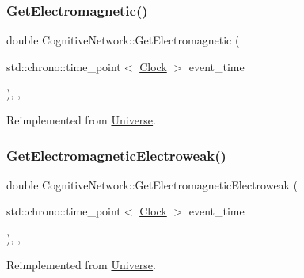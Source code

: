 \mbox{\label{classCognitiveNetwork_a09e5a1c774c84529a7adfe56fadb7467}} 
\subsubsection{\texorpdfstring{Get\+Electromagnetic()}{GetElectromagnetic()}}
{\footnotesize\ttfamily double Cognitive\+Network\+::\+Get\+Electromagnetic (\begin{DoxyParamCaption}\item[{std\+::chrono\+::time\+\_\+point$<$ \mbox{\hyperlink{universe_8h_a0ef8d951d1ca5ab3cfaf7ab4c7a6fd80}{Clock}} $>$}]{event\+\_\+time }\end{DoxyParamCaption})\hspace{0.3cm}{\ttfamily [inline]}, {\ttfamily [final]}, {\ttfamily [virtual]}}



Reimplemented from \mbox{\hyperlink{classUniverse_a63b850ef3f3394313353109d222bf5d1}{Universe}}.

\mbox{\label{classCognitiveNetwork_a8c4e0454068f714691ae250f795cdb67}} 
\subsubsection{\texorpdfstring{Get\+Electromagnetic\+Electroweak()}{GetElectromagneticElectroweak()}}
{\footnotesize\ttfamily double Cognitive\+Network\+::\+Get\+Electromagnetic\+Electroweak (\begin{DoxyParamCaption}\item[{std\+::chrono\+::time\+\_\+point$<$ \mbox{\hyperlink{universe_8h_a0ef8d951d1ca5ab3cfaf7ab4c7a6fd80}{Clock}} $>$}]{event\+\_\+time }\end{DoxyParamCaption})\hspace{0.3cm}{\ttfamily [inline]}, {\ttfamily [final]}, {\ttfamily [virtual]}}



Reimplemented from \mbox{\hyperlink{classUniverse_a9f099605c082e7fa755787a6a8cab7ba}{Universe}}.

